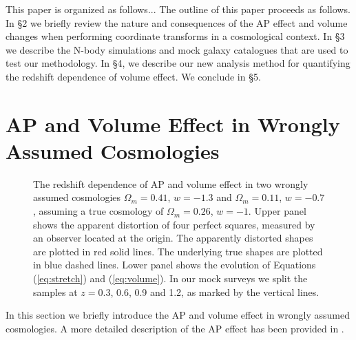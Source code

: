 \documentclass[iop]{emulateapj}
\begin{document}


This paper is organized as follows...
The outline of this paper proceeds as follows. 
In \S 2 we briefly review the nature and consequences of the AP effect and volume changes when performing coordinate transforms in a cosmological context. 
In \S 3 we describe the N-body simulations and mock galaxy catalogues that are used to test our methodology.
In \S 4, we describe our new analysis method for quantifying the redshift dependence of volume effect.
We conclude in \S 5.


\section{AP and Volume Effect in Wrongly Assumed Cosmologies}
\label{sec:Voleffect}

\begin{figure*}
   \centering{
   }
   \caption{\label{fig_xy}
   The redshift dependence of AP and volume effect in two wrongly assumed cosmologies $\Omega_m=0.41$, $w=-1.3$ and $\Omega_m=0.11$, $w=-0.7$,
   assuming a true cosmology of $\Omega_m=0.26$, $w=-1$.
   Upper panel shows the apparent distortion of four perfect squares,
   measured by an observer located at the origin.
   The apparently distorted shapes are plotted in red solid lines.
   The underlying true shapes are plotted in blue dashed lines.
   Lower panel shows the evolution of Equations (\ref{eq:stretch}) and (\ref{eq:volume}).
   In our mock surveys we split the samples at $z=0.3$, 0.6, 0.9 and 1.2, as marked by the vertical lines.
   }
\end{figure*}

In this section we briefly introduce the AP and volume effect in wrongly assumed cosmologies.
A more detailed description of the AP effect has been provided in \cite{Li2014}.
\end{document}
